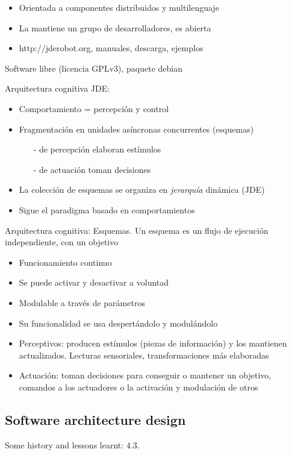 \documentclass[twocolumn]{svjour3}          %
\begin{document}
\begin{itemize}
\item Orientada a componentes distribuidos y multilenguaje
\item La mantiene un grupo de desarrolladores, es abierta
\item {http://jderobot.org}, manuales, descarga, ejemplos
\end{itemize}
Software libre (licencia GPLv3), paquete debian


Arquitectura cognitiva JDE:
\begin{itemize}
\item Comportamiento = {percepción} y {control}
\item Fragmentación en unidades asíncronas concurrentes (esquemas)
\begin{itemize}
\item[-] de percepción elaboran estímulos
\item[-] de actuación toman decisiones
\end{itemize}
\item La colección de esquemas se organiza en \textit{jerarquía} dinámica (JDE)
\item Sigue el paradigma basado en comportamientos
\end{itemize}

Arquitectura cognitiva: Esquemas.
Un {esquema} es un flujo de ejecución independiente, con un objetivo
\begin{itemize}
\item Funcionamiento continuo
\item Se puede activar y desactivar a voluntad
\item Modulable a través de parámetros
\item Su funcionalidad se usa despertándolo y modulándolo
\item {Perceptivos}: producen estímulos (piezas de información) y los mantienen actualizados. Lecturas sensoriales, transformaciones más elaboradas 
\item {Actuación}: toman decisiones para conseguir o mantener un objetivo, comandos a los actuadores o la activación y modulación de otros 
\end{itemize}



\subsection{Software architecture design}

Some history and lessons learnt: 4.3. 
\end{document}
